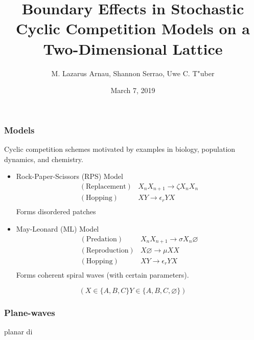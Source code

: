 \documentclass{beamer}
\title{\large Boundary Effects in Stochastic Cyclic Competition Models on a Two-Dimensional Lattice}
\author{M. Lazarus Arnau, Shannon Serrao, Uwe C. T\a"uber}
\institute
{
    Department of Physics,\\
    Virginia Polytechnic Institute and State University
}
\date{March 7, 2019}
\begin{document}
    \frame{\titlepage}

    \begin{frame}
        \frametitle{Models}

        Cyclic competition schemes motivated by examples in biology, population dynamics, and chemistry.

        \begin{itemize}
            \item Rock-Paper-Scissors (RPS) Model
                \begin{align*}
                    (\text{Replacement}) & X_nX_{n+1} \rightarrow{\zeta} X_n X_n\\
                    (\text{Hopping}) & XY \rightarrow{\epsilon_r} YX \\
                \end{align*}
                Forms disordered patches

            \item May-Leonard (ML) Model
                \begin{align*}
                    (\text{Predation}) & X_nX_{n+1} \rightarrow{\sigma} X_n \varnothing \\
                    (\text{Reproduction}) & X \varnothing \rightarrow{\mu} XX \\
                    (\text{Hopping}) & XY \rightarrow{\epsilon_r} YX \\
                \end{align*}
                Forms coherent spiral waves (with certain parameters).
        \end{itemize}
        \begin{equation*}
            \left( X \in \{ A, B, C\} Y \in \{A, B, C, \varnothing\}\right)
        \end{equation*}
    \end{frame}

    \begin{frame}
        \frametitle{Plane-waves}

        planar di
    \end{frame}
\end{document}
